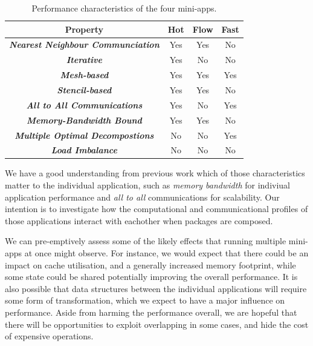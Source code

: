 \documentclass[runningheads,a4paper]{llncs}
\begin{document}
\begin{table}[h]
  \begin{center}
    \begin{tabular}{cccc}
      \hline
      \textbf{Property} & \textbf{Hot} & \textbf{Flow} & \textbf{Fast} \\
      \hline
      \textit{\textbf{Nearest Neighbour Communciation}} & Yes & Yes & No  \\
      \textit{\textbf{Iterative}} & Yes & No & No \\
      \textit{\textbf{Mesh-based}} & Yes & Yes & Yes \\
      \textit{\textbf{Stencil-based}} & Yes & Yes & No \\
      \textit{\textbf{All to All Communications}} & Yes & No & Yes \\
      \textit{\textbf{Memory-Bandwidth Bound}} & Yes & Yes & No \\
      \textit{\textbf{Multiple Optimal Decompostions}} & No & No & Yes \\
      \textit{\textbf{Load Imbalance}} & No & No & No \\
    \end{tabular}
  \end{center}
  \caption{Performance characteristics of the four mini-apps.}
  \label{tab:perf-char-mini-apps}
\end{table}

We have a good understanding from previous work which of those characteristics matter to the individual application, such as \textit{memory bandwidth} for indiviual application performance and \textit{all to all} communications for scalability. Our intention is to investigate how the computational and communicational profiles of those applications interact with eachother when packages are composed.

We can pre-emptively assess some of the likely effects that running multiple mini-apps at once might observe. For instance, we would expect that there could be an impact on cache utilisation, and a generally increased memory footprint, while some state could be shared potentially improving the overall performance. It is also possible that data structures between the individual applications will require some form of transformation, which we expect to have a major influence on performance. Aside from harming the performance overall, we are hopeful that there will be opportunities to exploit overlapping in some cases, and hide the cost of expensive operations.
\end{document}
